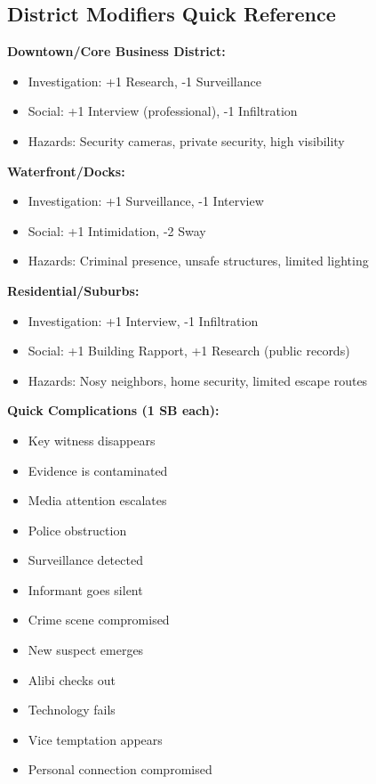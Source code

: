 \documentclass[11pt]{article}
\begin{document}
\subsection{District Modifiers Quick Reference}

\textbf{Downtown/Core Business District:}
\begin{itemize}
\item Investigation: +1 Research, -1 Surveillance
\item Social: +1 Interview (professional), -1 Infiltration
\item Hazards: Security cameras, private security, high visibility
\end{itemize}

\textbf{Waterfront/Docks:}
\begin{itemize}
\item Investigation: +1 Surveillance, -1 Interview
\item Social: +1 Intimidation, -2 Sway
\item Hazards: Criminal presence, unsafe structures, limited lighting
\end{itemize}

\textbf{Residential/Suburbs:}
\begin{itemize}
\item Investigation: +1 Interview, -1 Infiltration
\item Social: +1 Building Rapport, +1 Research (public records)
\item Hazards: Nosy neighbors, home security, limited escape routes
\end{itemize}

\textbf{Quick Complications (1 SB each):}
\begin{itemize}
\item Key witness disappears
\item Evidence is contaminated
\item Media attention escalates
\item Police obstruction
\item Surveillance detected
\item Informant goes silent
\item Crime scene compromised
\item New suspect emerges
\item Alibi checks out
\item Technology fails
\item Vice temptation appears
\item Personal connection compromised
\end{itemize}
\end{document}
